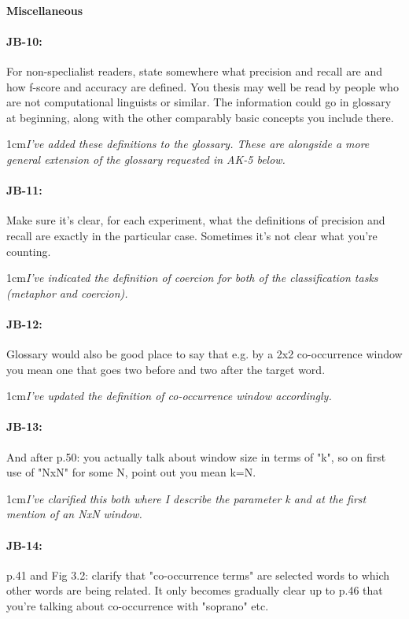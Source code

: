 \documentclass[11pt,a4paper]{article}
\newcommand{\res}[1]{\vspace{0.25cm} \begin{adjustwidth}{1cm}{}\emph{#1}\end{adjustwidth}}
\begin{document}
\paragraph{Miscellaneous}

\paragraph{JB-10:} For non-speclialist readers, state somewhere what precision and recall are and how f-score and accuracy are defined. You thesis may well be read by people who are not computational linguists or similar. The information could go in glossary at beginning, along with the other comparably basic concepts you include there.

\res{I've added these definitions to the glossary.  These are alongside a more general extension of the glossary requested in AK-5 below.}

\paragraph{JB-11:} Make sure it's clear, for each experiment, what the definitions of precision and recall are exactly in the particular case. Sometimes it's not clear what you're counting.

\res{I've indicated the definition of coercion for both of the classification tasks (metaphor and coercion).}

\paragraph{JB-12:} Glossary would also be good place to say that e.g. by a 2x2 co-occurrence window you mean one that goes two before and two after the target word.

\res{I've updated the definition of co-occurrence window accordingly.}

\paragraph{JB-13:} And after p.50: you actually talk about window size in terms of "k", so on first use of "NxN" for some N, point out you mean k=N.

\res{I've clarified this both where I describe the parameter k and at the first mention of an NxN window.}

\paragraph{JB-14:} p.41 and Fig 3.2: clarify that "co-occurrence terms" are selected words to which other words are being related. It only becomes gradually clear up to p.46 that you're talking about co-occurrence with "soprano" etc.
\end{document}
